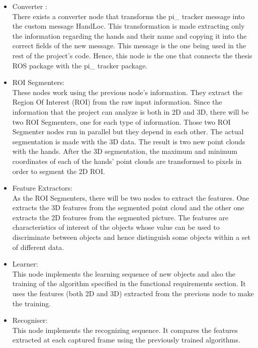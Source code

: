 \begin{itemize}
\item Converter : \\
There exists a converter node that transforms the pi\_ tracker message into the custom message HandLoc. This transformation is made extracting only the information regarding the hands and their name and copying it into the correct fields of the new message. 
This message is the one being used in the rest of the project's code. Hence, this node is the one that connects the thesis ROS package with the pi\_ tracker package.

\item ROI Segmenters:\\ 
These nodes work using the previous node's information. They extract the Region Of Interest (ROI) from the raw input information. Since the information that the project can analyze is both in 2D and 3D, there will be two ROI Segmenters, one for each type of information. 
Those two ROI Segmenter nodes run in parallel but they depend in each other. The actual segmentation is made with the 3D data. The result is two new point clouds with the hands.
After the 3D segmentation, the maximum and minimum coordinates of each of the hands' point clouds are transformed to pixels in order to segment the 2D ROI. 

\item Feature Extractors: \\
As the ROI Segmenters, there will be two nodes to extract the features. One extracts the 3D features from the segmented point cloud and the other one extracts the 2D features from the segmented picture. 
The features are characteristics of interest of the objects whose value can be used to discriminate between objects and hence distinguish some objects within a set of different data. 


\item Learner: \\
This node implements the learning sequence of new objects and also the training of the algorithm specified in the functional requirements section. 
It uses the features (both 2D and 3D) extracted from the previous node to make the training. 

\item Recogniser:\\ 
This node implements the recognizing sequence. It compares the features extracted at each captured frame using the previously trained algorithms. 
\end{itemize}
   
